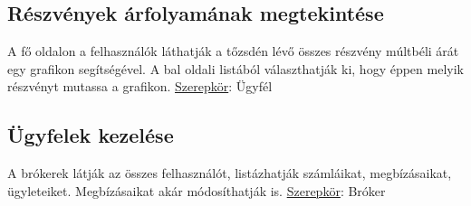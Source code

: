 \subsection{Részvények árfolyamának megtekintése}
A fő oldalon a felhasználók láthatják a tőzsdén lévő összes részvény múltbéli árát egy grafikon segítségével. A bal oldali listából választhatják ki, hogy éppen melyik részvényt mutassa a grafikon.
\newline \underline{Szerepkör}: Ügyfél

\subsection{Ügyfelek kezelése}
A brókerek látják az összes felhasználót, listázhatják számláikat, megbízásaikat, ügyleteiket. Megbízásaikat akár módosíthatják is.
\newline \underline{Szerepkör}: Bróker
